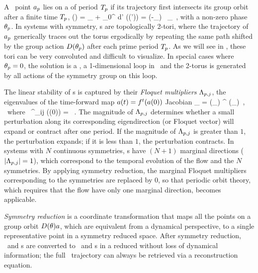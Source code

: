 A \statesp\ point $a_{p}$ lies on a \emph{\rpo} of period
${T_{p}}$ if its trajectory first intersects its group orbit after
a finite time ${T_{p}}$,
\beq
\ssp(\period{\rpprime})
    = \ssp_\rpprime
     + \int_0^\period{\rpprime} \!\!\!\!d\tau' \vel(\ssp (\tau'))
    = \matrixRep(-\theta_\rpprime) \,  \ssp_\rpprime
  \,,
with a non-zero phase $\theta_{p}$. In systems with 
symmetry, \rpo s are topologically 2-tori, where the trajectory of
$a_{p}$ generically traces out the torus ergodically by
repeating the same path shifted by the group action
${D}(\theta_{p})$ after each prime period
${T_{p}}$. As we will see in , these tori
can be very convoluted and difficult to visualize. In special cases where
$\theta_{p}=0$, the solution is a \po, a 1-dimensional loop in \statesp\ and
the 2-torus is generated by all actions of the symmetry group on this
loop.

The linear stability of \rpo s is captured by their \emph{Floquet
multipliers}  $\Lambda_{p,j}$, the eigenvalues of the time-forward map
$a(t)={f^{t}(a(0))}$ Jacobian
\beq
\jMpsRed_{\rpprime}
= \matrixRep(\theta_\rpprime ) \jMps^\period{\rpprime} (\ssp_\rpprime)
\,, \; \mbox{~where~}\;
\jMps^{\zeit}_{ij} (\ssp(0)) = \, .
The magnitude of $\Lambda_{p,j}$ determines whether a small perturbation
along its corresponding eigendirection (or Floquet vector) will expand or
contract after one period. If the magnitude of $\Lambda_{p,j}$ is
greater than $1$, the perturbation expands; if it is less than $1$, the
perturbation contracts. In systems with $N$ continuous symmetries, \rpo s
have $(N+1)$ marginal directions ($\left|\Lambda_{p,j}\right| = 1$),
which correspond to the temporal evolution of the flow and the $N$
symmetries. By applying symmetry reduction, the marginal Floquet
multipliers corresponding to the symmetries are replaced by $0$, so that 
periodic orbit theory, which requires that the flow have only one
marginal direction, becomes applicable.

\emph{Symmetry reduction} is a coordinate transformation that maps
all the points on a group orbit ${D}(\theta) a$, which are
equivalent from a dynamical perspective, to a single representative point in a symmetry reduced space.
After symmetry reduction, \reqva\ and \rpo s are converted to \eqva\ and \po s in a
reduced \statesp without loss of dynamical information; the full \statesp\
trajectory can always be retrieved via a reconstruction equation. 


